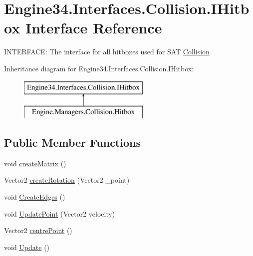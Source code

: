 \hypertarget{a00434}{}\section{Engine34.\+Interfaces.\+Collision.\+I\+Hitbox Interface Reference}
\label{a00434}


I\+N\+T\+E\+R\+F\+A\+CE\+: The interface for all hitboxes used for S\+AT \hyperlink{a00256}{Collision}  


Inheritance diagram for Engine34.\+Interfaces.\+Collision.\+I\+Hitbox\+:\begin{figure}[H]
\begin{center}
\leavevmode
\includegraphics[height=2.000000cm]{d1/d7e/a00434}
\end{center}
\end{figure}
\subsection*{Public Member Functions}
\begin{DoxyCompactItemize}
\item 
void \hyperlink{a00434_acd7cc791467a53026ad0657a13265f1e}{create\+Matrix} ()
\item 
Vector2 \hyperlink{a00434_a88740a6f4bc38fab5c8a58ca80f70aa7}{create\+Rotation} (Vector2 \+\_\+point)
\item 
void \hyperlink{a00434_a94297321cbc20a7cb6a98cf38b735a5b}{Create\+Edges} ()
\item 
void \hyperlink{a00434_ae50d408a05951b1e4db24bb468860103}{Update\+Point} (Vector2 velocity)
\item 
Vector2 \hyperlink{a00434_a5028f79a4e2537e578c528c932dee948}{centre\+Point} ()
\item 
void \hyperlink{a00434_a50eba986052aa1f6ac4b49426ab31042}{Update} ()
\end{DoxyCompactItemize}
